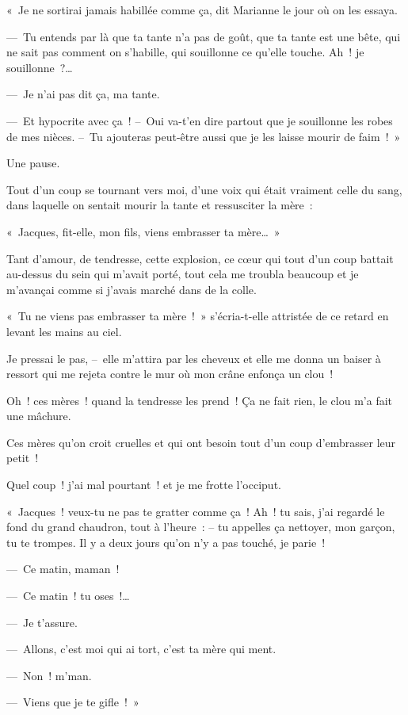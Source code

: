 \documentclass[french,twoside]{book} %
\begin{document}
« Je ne sortirai jamais habillée comme ça, dit Marianne le jour où on les essaya.\par
— Tu entends par là que ta tante n’a pas de goût, que ta tante est une bête, qui ne sait pas comment on s’habille, qui souillonne ce qu’elle touche. Ah ! je souillonne ?…\par
— Je n’ai pas dit ça, ma tante.\par
— Et hypocrite avec ça ! – Oui va-t’en dire partout que je souillonne les robes de mes nièces. – Tu ajouteras peut-être aussi que je les laisse mourir de faim ! »\par
Une pause.\par
Tout d’un coup se tournant vers moi, d’une voix qui était vraiment celle du sang, dans laquelle on sentait mourir la tante et ressusciter la mère :\par
« Jacques, fit-elle, mon fils, viens embrasser ta mère… »\par
Tant d’amour, de tendresse, cette explosion, ce cœur qui tout d’un coup battait au-dessus du sein qui m’avait porté, tout cela me troubla beaucoup et je m’avançai comme si j’avais marché dans de la colle.\par
« Tu ne viens pas embrasser ta mère ! » s’écria-t-elle attristée de ce retard en levant les mains au ciel.\par
Je pressai le pas, – elle m’attira par les cheveux et elle me donna un baiser à ressort qui me rejeta contre le mur où mon crâne enfonça un clou !\par
Oh ! ces mères ! quand la tendresse les prend ! Ça ne fait rien, le clou m’a fait une mâchure.\par
Ces mères qu’on croit cruelles et qui ont besoin tout d’un coup d’embrasser leur petit !\par
Quel coup ! j’ai mal pourtant ! et je me frotte l’occiput.\par
« Jacques ! veux-tu ne pas te gratter comme ça ! Ah ! tu sais, j’ai regardé le fond du grand chaudron, tout à l’heure : – tu appelles ça nettoyer, mon garçon, tu te trompes. Il y a deux jours qu’on n’y a pas touché, je parie !\par
— Ce matin, maman !\par
— Ce matin ! tu oses !…\par
— Je t’assure.\par
— Allons, c’est moi qui ai tort, c’est ta mère qui ment.\par
— Non ! m’man.\par
— Viens que je te gifle ! »\par
\end{document}
